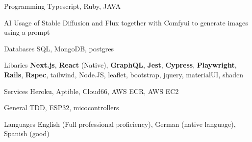 

\begin{cvskills}

  \cvskill
    {Programming} %
    {Typescript, Ruby, JAVA } %

  \cvskill
    {AI} %
    {Usage of Stable Diffusion and Flux together with Comfyui to generate images using a prompt} %

  \cvskill
    {Databases} %
    {SQL, MongoDB, postgres} %

  \cvskill
    {Libaries} %
    {\textbf{Next.js}, \textbf{React} (Native), \textbf{GraphQL}, \textbf{Jest}, \textbf{Cypress}, \textbf{Playwright}, \textbf{Rails}, \textbf{Rspec}, tailwind, Node.JS, leaflet, bootstrap, jquery, materialUI, shadcn } %


  \cvskill
    {Services} %
    {Heroku, Aptible, Cloud66, AWS ECR, AWS EC2 } %

  \cvskill
    {General} %
    {TDD, ESP32, micocontrollers} %

  \cvskill
    {Languages} %
    {English (Full professional proficiency), German (native language), Spanish (good)} %

\end{cvskills}
